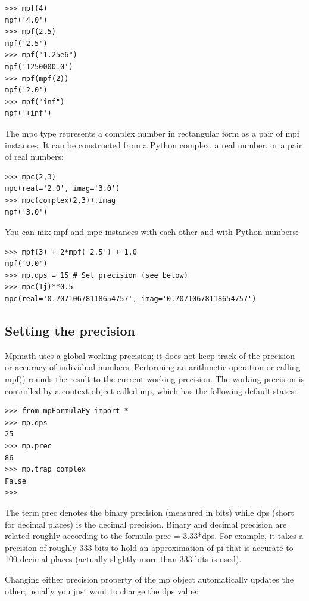 \begin{lstlisting}
>>> mpf(4)
mpf('4.0')
>>> mpf(2.5)
mpf('2.5')
>>> mpf("1.25e6")
mpf('1250000.0')
>>> mpf(mpf(2))
mpf('2.0')
>>> mpf("inf")
mpf('+inf')
\end{lstlisting}


The mpc type represents a complex number in rectangular form as a pair of mpf instances. It can be constructed from a Python complex, a real number, or a pair of real numbers:

\begin{lstlisting}
>>> mpc(2,3)
mpc(real='2.0', imag='3.0')
>>> mpc(complex(2,3)).imag
mpf('3.0')
\end{lstlisting}


You can mix mpf and mpc instances with each other and with Python numbers:

\begin{lstlisting}
>>> mpf(3) + 2*mpf('2.5') + 1.0
mpf('9.0')
>>> mp.dps = 15 # Set precision (see below)
>>> mpc(1j)**0.5
mpc(real='0.70710678118654757', imag='0.70710678118654757')
\end{lstlisting}


\subsection{Setting the precision} 

Mpmath uses a global working precision; it does not keep track of the precision or accuracy of individual numbers. Performing an arithmetic operation or calling mpf() rounds the result to the current working precision. The working precision is controlled by a context object called mp, which has the following default states:

\begin{lstlisting}
>>> from mpFormulaPy import *
>>> mp.dps
25
>>> mp.prec
86
>>> mp.trap_complex
False
>>>
\end{lstlisting}


The term prec denotes the binary precision (measured in bits) while dps (short for decimal places) is the decimal precision. Binary and decimal precision are related roughly according to the formula prec = 3.33*dps. For example, it takes a precision of roughly 333 bits to hold an approximation of pi that is accurate to 100 decimal places (actually slightly more than 333 bits is used).

\vpara
Changing either precision property of the mp object automatically updates the other; usually you just want to change the dps value:

